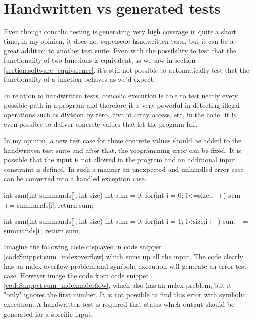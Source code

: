 \section{Handwritten vs generated tests}\label{section:handwritten_vs_generated_tests}
Even though concolic testing is generating very high coverage in quite a short time, in my opinion, it does not supersede handwritten tests, but it can be a great addition to another test suite. 
Even with the possibility to test that the functionality of two functions is equivalent, as we saw in section \ref{section:software_equivalence}, it's still not possible to automatically test that the functionality of a function behaves as we'd expect.

In relation to handwritten tests, concolic execution is able to test nearly every possible path in a program and therefore it is very powerful in detecting illegal operations such as division by zero, invalid array access, etc, in the code. It is even possible to deliver concrete values that let the program fail. 

In my opinion, a new test case for these concrete values should be added to the handwritten test suite and after that, the programming error can be fixed. It is possible that the input is not allowed in the program and an additional input constraint is defined. In such a manner an unexpected and unhandled error case can be converted into a handled exception case.

\begin{codesnippet}[caption={Sum with index overflow}, label={codeSnippet:sum_indexoverflow}]
int sum(int summands[], int size){
   int sum = 0;
   for(int i = 0; i<=size;i++){
      sum += summands[i];
   }
   return sum;
}
\end{codesnippet}
\begin{codesnippet}[caption={Sum with index "underflow"}, label={codeSnippet:sum_indexunderflow}]
int sum(int summands[], int size){
   int sum = 0;
   for(int i = 1; i<size;i++){
      sum += summands[i];
   }
   return sum;
}
\end{codesnippet}
Imagine the following code displayed in code snippet \ref{codeSnippet:sum_indexoverflow} which sums up all the input. The code clearly has an index overflow problem and symbolic execution will generate an error test case. However image the code from code snippet \ref{codeSnippet:sum_indexunderflow}, which also has an index problem, but it "only" ignores the first number. It is not possible to find this error with symbolic execution. A handwritten test is required that states which output should be generated for a specific input.
